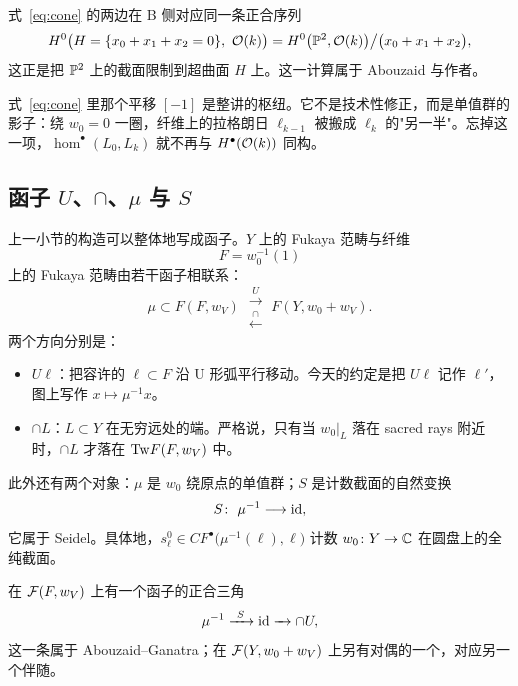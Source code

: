式~\eqref{eq:cone} 的两边在 B 侧对应同一条正合序列
\[
H^0\bigl(H=\{x_0+x_1+x_2=0\},\ \mathcal{O}(k)\bigr)
=H^0\bigl(\mathbb{P}^2,\mathcal{O}(k)\bigr)\big/\bigl(x_0+x_1+x_2\bigr),
\]
这正是把 $\mathbb{P}^2$ 上的截面限制到超曲面 $H$ 上。这一计算属于 Abouzaid 与作者。

\begin{remark}
式~\eqref{eq:cone} 里那个平移 $[-1]$ 是整讲的枢纽。它不是技术性修正，而是单值群的影子：绕 $w_0=0$ 一圈，纤维上的拉格朗日 $\ell_{k-1}$ 被搬成 $\ell_k$ 的"另一半"。忘掉这一项，$\hom^\bullet(L_0,L_k)$ 就不再与 $H^\bullet(\mathcal{O}(k))$ 同构。
\end{remark}

\subsection{\texorpdfstring{函子 $U$、$\cap$、$\mu$ 与 $S$}{函子 U、cap、mu 与 S}}

上一小节的构造可以整体地写成函子。$Y$ 上的 Fukaya 范畴与纤维
\[
F=w_0^{-1}(1)
\]
上的 Fukaya 范畴由若干函子相联系：
\[
\mu\subset F(F,w_V)\ \substack{\xrightarrow{\ U\ }\\[-2pt]\xleftarrow{\ \cap\ }}\ F(Y,w_0+w_V).
\]
两个方向分别是：
\begin{itemize}
  \item $U\ell$：把容许的 $\ell\subset F$ 沿 U 形弧平行移动。今天的约定是把 $U\ell$ 记作 $\ell'$，图上写作 $x\mapsto\mu^{-1}x$。
  \item $\cap L$：$L\subset Y$ 在无穷远处的端。严格说，只有当 $w_0|_L$ 落在 sacred rays 附近时，$\cap L$ 才落在 $\mathrm{Tw} F(F,w_V)$ 中。
\end{itemize}
此外还有两个对象：$\mu$ 是 $w_0$ 绕原点的单值群；$S$ 是计数截面的自然变换
\[
S\colon\ \mu^{-1}\longrightarrow\id ,
\]
它属于 Seidel。具体地，$s_\ell^0\in CF^\bullet\bigl(\mu^{-1}(\ell),\ell\bigr)$ 计数 $w_0\colon Y\to\mathbb{C}$ 在圆盘上的全纯截面。

在 $\mathcal{F}(F,w_V)$ 上有一个函子的正合三角
\[
\mu^{-1}\xto{\ S\ }\id\xto{\ \ }\cap U ,
\]
这一条属于 Abouzaid--Ganatra；在 $\mathcal{F}(Y,w_0+w_V)$ 上另有对偶的一个，对应另一个伴随。

